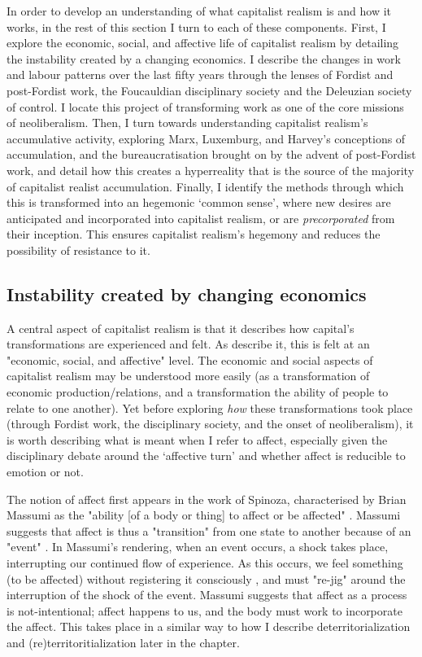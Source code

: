In order to develop an understanding of what capitalist realism is and how it works, in the rest of this section I turn to each of these components. First, I explore the economic, social, and affective life of capitalist realism by detailing the instability created by a changing economics. I describe the changes in work and labour patterns over the last fifty years through the lenses of Fordist and post-Fordist work, the Foucauldian disciplinary society and the Deleuzian society of control. I locate this project of transforming work as one of the core missions of neoliberalism. Then, I turn towards understanding capitalist realism's accumulative activity, exploring Marx, Luxemburg, and Harvey's conceptions of accumulation, and the bureaucratisation brought on by the advent of post-Fordist work, and detail how this creates a hyperreality that is the source of the majority of capitalist realist accumulation. Finally, I identify the methods through which this is transformed into an hegemonic `common sense', where new desires are anticipated and incorporated into capitalist realism, or are \emph{precorporated} from their inception. This ensures capitalist realism's hegemony and reduces the possibility of resistance to it.

\subsection{Instability created by changing economics}
\label{subsec:2-instability}

A central aspect of capitalist realism is that it describes how capital's transformations are experienced and felt. As \citet[p. 6]{shonkwiler_reading_2014} describe it, this is felt at an "economic, social, and affective" level. The economic and social aspects of capitalist realism may be understood more easily (as a transformation of economic production/relations, and a transformation the ability of people to relate to one another). Yet before exploring \textit{how} these transformations took place (through Fordist work, the disciplinary society,  and the onset of neoliberalism), it is worth describing what is meant when I refer to affect, especially given the disciplinary debate around the `affective turn' and whether affect is reducible to emotion or not.

The notion of affect first appears in the work of Spinoza, characterised by Brian Massumi as the "ability [of a body or thing] to affect or be affected" \citep[p. 48]{massumi_politics_2015}. Massumi suggests that affect is thus a "transition" \citeyearpar[p. 48]{massumi_politics_2015} from one state to another because of an "event"  \citeyearpar[p. 47]{massumi_politics_2015}. In Massumi's rendering, when an event occurs, a shock takes place, interrupting our continued flow of experience. As this occurs, we feel something (to be affected) without registering it consciously \citeyearpar[p. 53]{massumi_politics_2015}, and must "re-jig" around the interruption of the shock of the event. Massumi suggests that affect as a process is not-intentional; affect happens to us, and the body must work to incorporate the affect. This takes place in a similar way to how I describe deterritorialization and (re)territoritialization later in the chapter.

